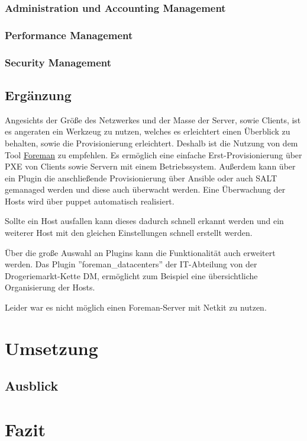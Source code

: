 \documentclass[a4paper]{article}
\begin{document}
\subsubsection{Administration und Accounting Management}
\subsubsection{Performance Management}
\subsubsection{Security Management}

\subsection{Ergänzung}
Angesichts der Größe des Netzwerkes und der Masse der Server, sowie Clients, ist es angeraten ein Werkzeug zu nutzen, welches es erleichtert einen Überblick zu behalten, sowie die Provisionierung erleichtert. Deshalb ist die Nutzung von dem Tool \href{www.theforeman.org}{Foreman} zu empfehlen. Es ermöglich eine einfache Erst-Provisionierung über PXE von Clients sowie Servern mit einem Betriebssystem. Außerdem kann über ein Plugin die anschließende Provisionierung über Ansible oder auch SALT gemanaged werden und diese auch überwacht werden. Eine Überwachung der Hosts wird über puppet automatisch realisiert.

Sollte ein Host ausfallen kann dieses dadurch schnell erkannt werden und ein weiterer Host mit den gleichen Einstellungen schnell erstellt werden.

Über die große Auswahl an Plugins kann die Funktionalität auch erweitert werden. Das Plugin ''foreman\_datacenters'' der IT-Abteilung von der Drogeriemarkt-Kette DM, ermöglicht zum Beispiel eine übersichtliche Organisierung der Hosts.

Leider war es nicht möglich einen Foreman-Server mit Netkit zu nutzen.

\section{Umsetzung}
\subsection{Ausblick}

\section{Fazit}
\end{document}
